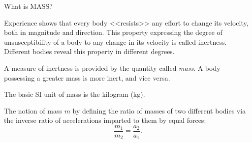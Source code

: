 \documentclass[18pt]{LectMechanics}
\begin{document}
\begin{frame}{What is MASS?}{}

	Experience shows that every body <<resists>> any effort to change its velocity, both in magnitude and
	direction. This property expressing the degree of unsusceptibility of a body to any change in its velocity is called inertness. Different bodies reveal this property in different degrees.

	A measure of inertness is provided by the quantity called \emph{mass}. A body possessing a greater mass is more inert, and vice versa.

	The basic SI unit of mass is the kilogram (kg).

	\begin{minipage}{0.5\linewidth}
		The notion of mass $m$ by defining the ratio of masses of two different bodies via the inverse ratio of accelerations imparted to them by equal forces:
		\begin{equation*}
			\frac{m_1}{m_2} = \frac{a_2}{a_1}.
		\end{equation*}
	\end{minipage}%
	\begin{minipage}{0.5\linewidth}
		\begin{center}
		\end{center}
	\end{minipage}


\end{frame}
\end{document}
